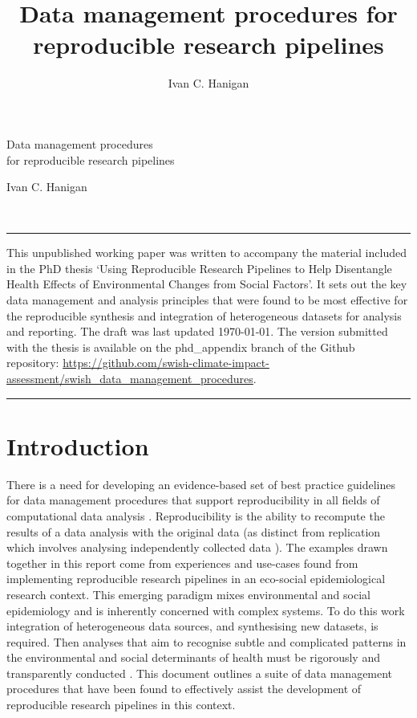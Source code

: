 \documentclass[11pt,a4paper]{article}
\title{Data management procedures for \\ reproducible research pipelines}
\author{
Ivan C. Hanigan
}
\date{}
\renewenvironment{abstract}{
  \hfill\begin{minipage}{1\textwidth}
  \rule{\textwidth}{1pt}\vspace{5pt}
  \normalsize
  \begin{justify}
  \bfseries\abstractname\vspace{5pt}
  \end{justify}}
  {\par\noindent\rule{\textwidth}{1pt}\end{minipage}
}
\begin{document}
\begin{singlespace}
\begin{center}
\huge Data management procedures \\ for reproducible research pipelines
\end{center}
\begin{center}
\large Ivan C. Hanigan
\end{center}
\begin{justify}
\footnotesize \emph{ 
}
\setcounter{num}{1}
\\[0.1cm]
\footnotesize \emph{ 
}
\end{justify}
\normalsize

\begin{abstract}
This unpublished working paper was written to accompany the material included in the PhD thesis `Using Reproducible Research Pipelines to Help Disentangle Health Effects of Environmental Changes from Social Factors'. It sets out the key data management and analysis principles that were found to be most effective for the reproducible synthesis and integration of
heterogeneous datasets for analysis and reporting. The draft was last updated \today. The version submitted with the thesis is available on the phd\_appendix branch of the Github repository: \url{https://github.com/swish-climate-impact-assessment/swish_data_management_procedures}.
\end{abstract}
\end{singlespace}

{
\hypersetup{linkcolor=black}
\setcounter{tocdepth}{2}
\tableofcontents
}

\clearpage

\section{Introduction}\label{introduction}

There is a need for developing an evidence-based set of best practice
guidelines for data management procedures that support reproducibility in all fields of computational data analysis \citep{Long2008,Noble2009,Peng}. 
Reproducibility is the ability to recompute the results of a data
analysis with the original data (as distinct from replication which involves analysing independently collected data \citep{Peng2011}). 
The examples drawn
together in this report come from experiences and use-cases found from implementing reproducible
research pipelines in an
eco-social epidemiological research context. This emerging paradigm 
mixes environmental and social epidemiology and is inherently concerned with complex systems. To do this work 
integration of heterogeneous data sources, and synthesising new datasets, is required.  Then analyses that aim to  recognise subtle and complicated patterns in
the environmental and social determinants of health must be rigorously and transparently conducted
\citep{McMichael2013}. This document outlines a suite of data management
procedures that have been found to effectively assist the development of
reproducible research pipelines in this context.
\end{document}
